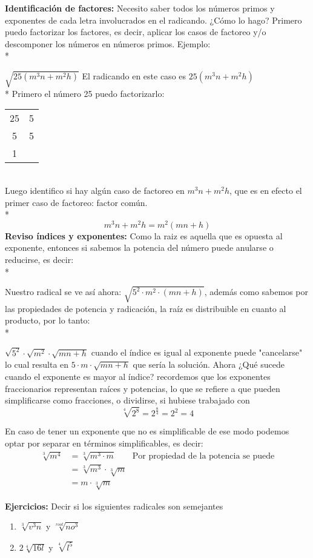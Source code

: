 \documentclass[a4paper]{article}
\begin{document}
\textbf{Identificación de factores:} Necesito saber todos los números primos y exponentes de cada letra involucrados en el radicando. ¿Cómo lo hago? Primero puedo factorizar los factores, es decir, aplicar los casos de factoreo y/o descomponer los números en números primos. Ejemplo:\\*

$\sqrt{25(m^3n+m^2h)}$ \quad El radicando en este caso es $25(m^3n+m^2h)$\\*
Primero el número 25 puedo factorizarlo:
\begin{tabular}{c|c}
    25 & 5 \\
    5 & 5 \\
    1&  \\        
\end{tabular}\\
Luego identifico si hay algún caso de factoreo en $m^3n+m^2h$, que es en efecto el primer caso de factoreo: factor común.\\*
\[
    m^3n+m^2h= m^2(mn+h)
\]
\textbf{Reviso índices y exponentes:} Como la raiz es aquella que es opuesta al exponente, entonces si sabemos la potencia del número puede anularse o reducirse, es decir:\\*

Nuestro radical se ve así ahora: $\sqrt{5^2\cdot m^2\cdot (mn+h)}$, además como sabemos por las propiedades de potencia y radicación, la raíz es distribuible en cuanto al producto, por lo tanto:\\*

$\sqrt{5^2}\cdot \sqrt{m^2} \cdot \sqrt{mn+h}$ cuando el índice es igual al exponente puede "cancelarse" lo cual resulta en $5\cdot m \cdot \sqrt{mn+h}$ que sería la solución. Ahora ¿Qué sucede cuando el exponente es mayor al índice? recordemos que los exponentes fraccionarios representan raíces y potencias, lo que se refiere a que pueden simplificarse como fracciones, o dividirse, si hubiese trabajado con 
\[
\sqrt[4]{2^8}=2^{\frac{8}{4}}=2^2=4
\]

En caso de tener un exponente que no es simplificable de ese modo podemos optar por separar en términos simplificables, es decir:
\begin{align*}
    \sqrt[3]{m^4} &= \sqrt[3]{m^3 \cdot m} \qquad \text{Por propiedad de la potencia se puede}\\
    &= \sqrt[3]{m^3} \cdot \sqrt[3]{m}\\
    &= m \cdot \sqrt[3]{m}
\end{align*}

\textbf{Ejercicios:}
Decir si los siguientes radicales son semejantes
\begin{enumerate}
    \item $\sqrt[3]{v^3n}$ y $\sqrt[root]{no^3}$
    \item $2\sqrt[4]{16l}$ y $\sqrt[4]{l^5}$
\end{enumerate}
\end{document}
